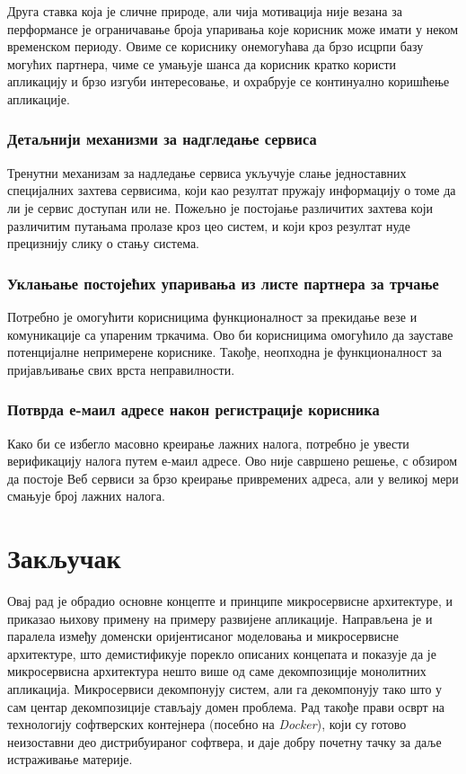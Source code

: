 \documentclass[12pt,oneside]{memoir}
\begin{document}
Друга ставка која је сличне природе, али чија мотивација није везана за перформансе је ограничавање броја упаривања које корисник може имати у неком временском периоду. Овиме се кориснику онемогућава да брзо исцрпи базу могућих партнера, чиме се умањује шанса да корисник кратко користи апликацију и брзо изгуби интересовање, и охрабрује се континуално коришћење апликације.

\subsection{Детаљнији механизми за надгледање сервиса}
Тренутни механизам за надледање сервиса укључује слање једноставних специјалних захтева сервисима, који као резултат пружају информацију о томе да ли је сервис доступан или не. Пожељно је постојање различитих захтева који различитим путањама пролазе кроз цео систем, и који кроз резултат нуде прецизнију слику о стању система.

\subsection{Уклањање постојећих упаривања из листе партнера за трчање}
Потребно је омогућити корисницима функционалност за прекидање везе и комуникације са упареним тркачима. Ово би корисницима омогућило да зауставе потенцијалне непримерене кориснике. Такође, неопходна је функционалност за пријављивање свих врста неправилности.

\subsection{Потврда е-маил адресе након регистрације корисника}
Како би се избегло масовно креирање лажних налога, потребно је увести верификацију налога путем е-маил адресе. Ово није савршено решење, с обзиром да постоје Веб сервиси за брзо креирање привремених адреса, али у великој мери смањује број лажних налога.

\chapter{Закључак}
Овај рад је обрадио основне концепте и принципе микросервисне архитектуре, и приказао њихову примену на примеру развијене апликације. Направљена је и паралела између доменски оријентисаног моделовања и микросервисне архитектуре, што демистификује порекло описаних концепата и показује да је микросервисна архитектура нешто више од саме декомпозиције монолитних апликација. Микросервиси декомпонују систем, али га декомпонују тако што у сам центар декомпозиције стављају домен проблема. Рад такође прави осврт на технологију софтверских контејнера (посебно на \textit{Docker}), који су готово неизоставни део дистрибуираног софтвера, и даје добру почетну тачку за даље истраживање материје.
\end{document}
